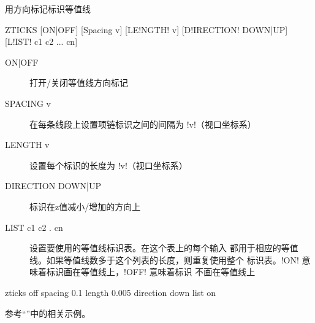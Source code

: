 \label{cmd:zticks}

用方向标记标识等值线

\begin{SACSTX}
ZTICKS [ON|OFF] [Spacing v] [LE!NGTH! v] [D!IRECTION! DOWN|UP] [L!IST! c1 c2 ... cn]
\end{SACSTX}

\begin{description}
\item [ON|OFF] 打开/关闭等值线方向标记
\item [SPACING v] 在每条线段上设置项链标识之间的间隔为 !v!（视口坐标系）
\item [LENGTH v] 设置每个标识的长度为 !v!（视口坐标系）
\item [DIRECTION DOWN|UP] 标识在z值减小/增加的方向上
\item [LIST c1 c2 . cn] 设置要使用的等值线标识表。在这个表上的每个输入
    都用于相应的等值线。如果等值线数多于这个列表的长度，则重复使用整个
    标识表。!ON! 意味着标识画在等值线上，!OFF! 意味着标识
    不画在等值线上
\end{description}

\begin{SACDFT}
zticks off spacing 0.1 length 0.005 direction down list on
\end{SACDFT}

参考``''中的相关示例。
